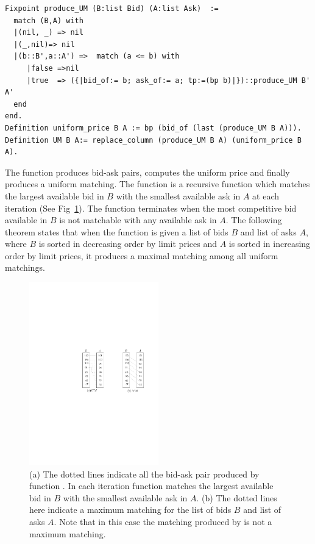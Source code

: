 \documentclass[a4paper,UKenglish,cleveref, autoref]{lipics-v2019}
\begin{document}
\begin{verbatim}
Fixpoint produce_UM (B:list Bid) (A:list Ask)  :=
  match (B,A) with
  |(nil, _) => nil
  |(_,nil)=> nil
  |(b::B',a::A') =>  match (a <= b) with
     |false =>nil
     |true  => ({|bid_of:= b; ask_of:= a; tp:=(bp b)|})::produce_UM B' A'
  end
end.
Definition uniform_price B A := bp (bid_of (last (produce_UM B A))).
Definition UM B A:= replace_column (produce_UM B A) (uniform_price B A).
\end{verbatim}


The function  produces bid-ask pairs,  computes the uniform price and finally  produces a uniform matching. The function  is a recursive function which matches the largest available bid in $B$ with the smallest available ask in $A$ at each iteration (See Fig~\ref{fig:UM}). The function   terminates when the most competitive bid available in $B$ is not matchable with any available ask in $A$. The following theorem states that when the function  is given a list of bids $B$ and list of asks $A$, where $B$ is sorted in decreasing order by limit prices and $A$ is sorted in increasing order by limit prices,  it produces a maximal matching among all uniform matchings.

\begin{theorem}
\end{theorem}

\begin{figure}[h!]
\centering
\includegraphics[width=0.5\textwidth]{UM.pdf}
\caption{(a) The dotted lines indicate all the bid-ask pair  produced by function . In each iteration function   matches the largest available bid in $B$ with the smallest available ask in $A$.  (b) The dotted lines here indicate a maximum matching for the list of bids $B$ and list of asks $A$. Note that in this case the matching produced by  is not a maximum matching. }
\label{fig:UM}
\end{figure}
\end{document}
